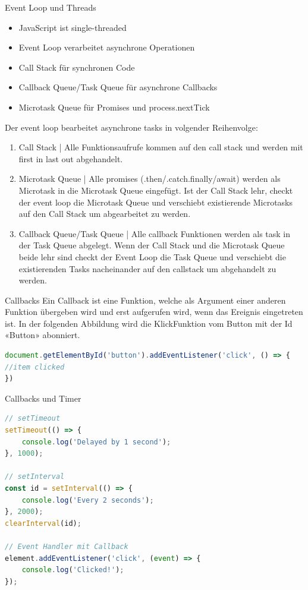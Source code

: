 \begin{concept}{Event Loop und Threads}
    \begin{itemize}
        \item JavaScript ist single-threaded
        \item Event Loop verarbeitet asynchrone Operationen
        \item Call Stack für synchronen Code
        \item Callback Queue/Task Queue für asynchrone Callbacks
        \item Microtask Queue für Promises und process.nextTick
    \end{itemize}
	\vspace{5mm}
	Der event loop bearbeitet asynchrone tasks in volgender Reihenvolge:
	\begin{enumerate}
		\item Call Stack | Alle Funktionsaufrufe kommen auf den call stack und werden mit first in last out abgehandelt.
		\item Microtask Queue | Alle promises (.then/.catch.finally/await) werden als Microtask in die Microtask Queue eingefügt. Ist der Call Stack lehr, checkt der event loop die Microtask Queue und verschiebt existierende Microtasks auf den Call Stack um abgearbeitet zu werden.
		\item Callback Queue/Task Queue | Alle callback Funktionen werden als task in der Task Queue abgelegt. Wenn der Call Stack und die Microtask Queue beide lehr sind checkt der Event Loop die Task Queue und verschiebt die existierenden Tasks nacheinander auf den callstack um abgehandelt zu werden.
	\end{enumerate}
\end{concept}

\begin{definition}{Callbacks}
Ein Callback ist eine Funktion, welche als Argument einer anderen Funktion übergeben wird und erst aufgerufen wird, wenn das Ereignis eingetreten ist. 
In der folgenden Abbildung wird die KlickFunktion vom Button mit der Id «Button» abonniert.
\begin{lstlisting}[language=JavaScript, style=basesmol]
document.getElementById('button').addEventListener('click', () => {
//item clicked
})
\end{lstlisting}
\end{definition}

\begin{KR}{Callbacks und Timer}
\begin{lstlisting}[language=JavaScript, style=basesmol]
// setTimeout
setTimeout(() => {
    console.log('Delayed by 1 second');
}, 1000);

// setInterval
const id = setInterval(() => {
    console.log('Every 2 seconds');
}, 2000);
clearInterval(id);

// Event Handler mit Callback
element.addEventListener('click', (event) => {
    console.log('Clicked!');
});
\end{lstlisting}
\end{KR}

